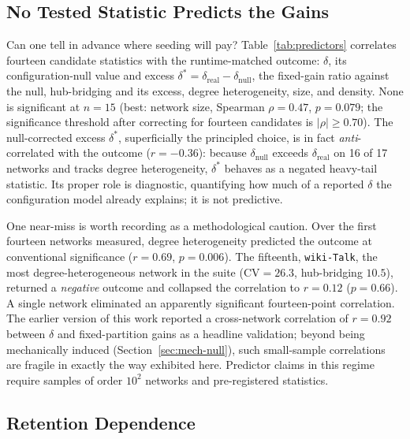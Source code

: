 \documentclass[10pt,journal,compsoc]{IEEEtran}
\begin{document}
\subsection{No Tested Statistic Predicts the Gains}
\label{sec:boundary-predictor}



Can one tell in advance where seeding will pay?
Table~\ref{tab:predictors} correlates fourteen candidate statistics with the runtime-matched outcome: $\delta$, its configuration-null value and excess $\delta^{*} = \delta_{\mathrm{real}} - \delta_{\mathrm{null}}$, the fixed-gain ratio against the null, hub-bridging and its excess, degree heterogeneity, size, and density.
None is significant at $n = 15$ (best: network size, Spearman $\rho = 0.47$, $p = 0.079$; the significance threshold after correcting for fourteen candidates is $|\rho| \ge 0.70$).
The null-corrected excess $\delta^{*}$, superficially the principled choice, is in fact \emph{anti}-correlated with the outcome ($r = -0.36$): because $\delta_{\mathrm{null}}$ exceeds $\delta_{\mathrm{real}}$ on 16 of 17 networks and tracks degree heterogeneity, $\delta^{*}$ behaves as a negated heavy-tail statistic.
Its proper role is diagnostic, quantifying how much of a reported $\delta$ the configuration model already explains; it is not predictive.

One near-miss is worth recording as a methodological caution.
Over the first fourteen networks measured, degree heterogeneity predicted the outcome at conventional significance ($r = 0.69$, $p = 0.006$).
The fifteenth, \texttt{wiki-Talk}, the most degree-heterogeneous network in the suite ($\mathrm{CV} = 26.3$, hub-bridging $10.5$), returned a \emph{negative} outcome and collapsed the correlation to $r = 0.12$ ($p = 0.66$).
A single network eliminated an apparently significant fourteen-point correlation.
The earlier version of this work reported a cross-network correlation of $r = 0.92$ between $\delta$ and fixed-partition gains as a headline validation; beyond being mechanically induced (Section~\ref{sec:mech-null}), such small-sample correlations are fragile in exactly the way exhibited here.
Predictor claims in this regime require samples of order $10^2$ networks and pre-registered statistics.

\subsection{Retention Dependence}
\label{sec:boundary-retention}
\end{document}
